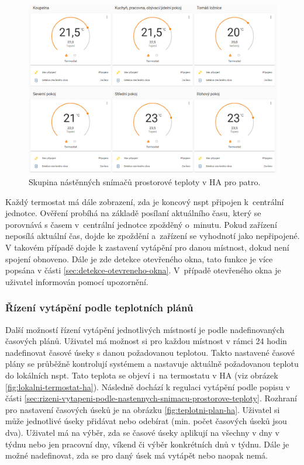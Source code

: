 \begin{figure}[H]
    \centering
    \includegraphics[width=\textwidth]{images/software-ha/prehled-lokalnich-termostaty-patro.png}
    \caption{Skupina nástěnných snímačů prostorové teploty v HA pro patro.}
    \label{fig:prehled-lokalnich-termostaty-patro}
\end{figure}

Každý termostat má dále zobrazení, zda je koncový \acrshort{nspt} připojen k~centrální jednotce.  Ověření probíhá na základě posílaní aktuálního času, který se porovnává s časem v~centrální jednotce zpožděný o~minutu. Pokud zařízení neposílá aktuální čas, dojde ke zpoždění a~zařízení se vyhodnotí jako nepřipojené. V takovém případě dojde k zastavení vytápění pro danou místnost, dokud není spojení obnoveno. Dále je zde detekce otevřeného okna, tato funkce je více popsána v části \ref{sec:detekce-otevreneho-okna}. V~případě otevřeného okna je uživatel informován pomocí upozornění. 



\subsubsection{Řízení vytápění podle teplotních plánů} 
\label{sec:rizeni-vytapeni-podle-teplotnich-planu}
Další možností řízení vytápění jednotlivých místností je podle nadefinovaných časových plánů. Uživatel má možnost si pro každou místnost v rámci 24 hodin nadefinovat časové úseky s danou požadovanou teplotou. Takto nastavené časové plány se průběžně kontrolují systémem a nastavuje aktuálně požadovanou teplotu do lokálních \acrshort{nspt}. Tato teplota se objeví i~na termostatu v HA (viz obrázek \ref{fig:lokalni-termostat-ha}). Následně dochází k regulaci vytápění podle popisu v části \ref{sec:rizeni-vytapeni-podle-nastennych-snimacu-prostorove-teploty}. Rozhraní pro nastavení časových úseků je na obrázku \ref{fig:teplotni-plan-ha}. Uživatel si může jednotlivé úseky přidávat nebo odebírat (min. počet časových úseků jsou dva). Uživatel má na výběr, zda se časové úseky aplikují na všechny v dny v týdnu nebo jen pracovní dny, víkend či výběr konkrétních dnů v týdnu. Dále je možné nadefinovat, zda se pro daný úsek má vytápět nebo naopak nemá.


